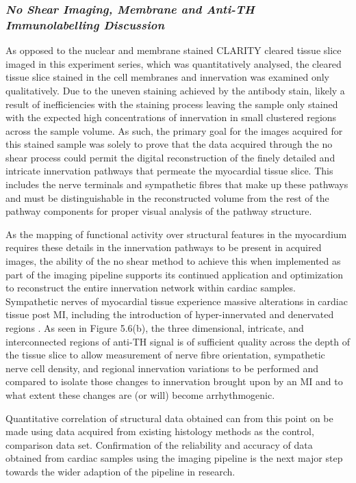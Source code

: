 \subsubsection{\textit{No Shear Imaging, Membrane and Anti-TH Immunolabelling Discussion}}
As opposed to the nuclear and membrane stained CLARITY cleared tissue slice imaged in this experiment series, which was quantitatively analysed, the cleared tissue slice stained in the cell membranes and innervation was examined only qualitatively. Due to the uneven staining achieved by the antibody stain, likely a result of inefficiencies with the staining process leaving the sample only stained with the expected high concentrations  of innervation in small clustered regions across the sample volume. As such, the primary goal for the images acquired for this stained sample was solely to prove that the data acquired through the no shear process could permit the digital reconstruction of the finely detailed and intricate innervation pathways that permeate the myocardial tissue slice. This includes the nerve terminals and sympathetic fibres that make up these pathways and must be distinguishable in the reconstructed volume from the rest of the pathway components for proper visual analysis of the pathway structure. 

As the mapping of functional activity over structural features in the myocardium requires these details in the innervation pathways to be present in acquired images, the ability of the no shear method to achieve this when implemented as part of the imaging pipeline supports its continued application and optimization to reconstruct the entire innervation network within cardiac samples. Sympathetic nerves of myocardial tissue experience massive alterations in cardiac tissue post MI, including the introduction of hyper-innervated and denervated regions \cite{huethorst_development_2022}. As seen in Figure 5.6(b), the three dimensional, intricate, and interconnected regions of anti-TH signal is of sufficient quality across the depth of the tissue slice to allow measurement of nerve fibre orientation, sympathetic nerve cell density, and regional innervation variations to be performed and compared to isolate those changes to innervation brought upon by an MI and to what extent these changes are (or will) become arrhythmogenic. 

Quantitative correlation of structural data obtained can from this point on be made using data acquired from existing histology methods as the control, comparison data set. Confirmation of the reliability and accuracy of data obtained from cardiac samples using the imaging pipeline is the next major step towards the wider adaption of the pipeline in research.



